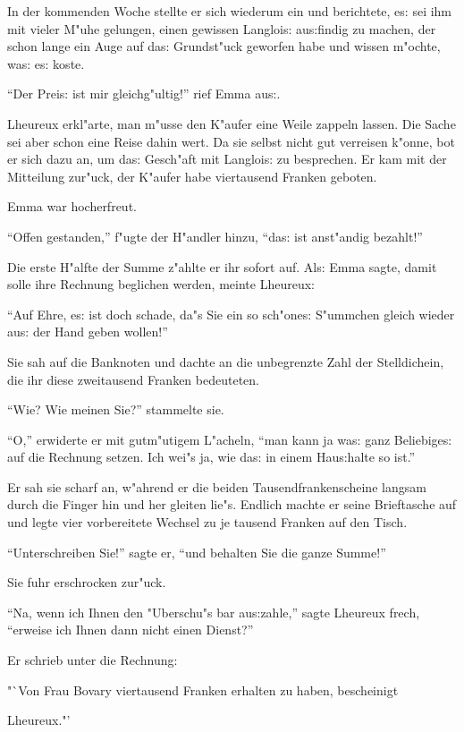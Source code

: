 \documentclass[oneside,12pt]{book}
\newcommand{\s}{s:}%
\begin{document}
In der kommenden Woche stellte er sich wiederum ein und berichtete,
e{\s} sei ihm mit vieler M"uhe gelungen, einen gewissen Langloi{\s}
au{\s}findig zu machen, der schon lange ein Auge auf da{\s}
Grundst"uck geworfen habe und wissen m"ochte, wa{\s} e{\s} koste.

"`Der Prei{\s} ist mir gleichg"ultig!"' rief Emma au{\s}.

Lheureux erkl"arte, man m"usse den K"aufer eine Weile zappeln
lassen. Die Sache sei aber schon eine Reise dahin wert. Da sie
selbst nicht gut verreisen k"onne, bot er sich dazu an, um da{\s}
Gesch"aft mit Langloi{\s} zu besprechen. Er kam mit der Mitteilung
zur"uck, der K"aufer habe viertausend Franken geboten.

Emma war hocherfreut.

"`Offen gestanden,"' f"ugte der H"andler hinzu, "`da{\s} ist
anst"andig bezahlt!"'

Die erste H"alfte der Summe z"ahlte er ihr sofort auf. Al{\s} Emma
sagte, damit solle ihre Rechnung beglichen werden, meinte
Lheureux:

"`Auf Ehre, e{\s} ist doch schade, da"s Sie ein so sch"one{\s}
S"ummchen gleich wieder au{\s} der Hand geben wollen!"'

Sie sah auf die Banknoten und dachte an die unbegrenzte Zahl der
Stelldichein, die ihr diese zweitausend Franken bedeuteten.

"`Wie? Wie meinen Sie?"' stammelte sie.

"`O,"' erwiderte er mit gutm"utigem L"acheln, "`man kann ja wa{\s}
ganz Beliebige{\s} auf die Rechnung setzen. Ich wei"s ja, wie
da{\s} in einem Hau{\s}halte so ist."'

Er sah sie scharf an, w"ahrend er die beiden Tausendfrankenscheine
langsam durch die Finger hin und her gleiten lie"s. Endlich machte
er seine Brieftasche auf und legte vier vorbereitete Wechsel zu je
tausend Franken auf den Tisch.

"`Unterschreiben Sie!"' sagte er, "`und behalten Sie die ganze
Summe!"'

Sie fuhr erschrocken zur"uck.

"`Na, wenn ich Ihnen den "Uberschu"s bar au{\s}zahle,"' sagte
Lheureux frech, "`erweise ich Ihnen dann nicht einen Dienst?"'

Er schrieb unter die Rechnung:

"`Von Frau Bovary viertausend Franken erhalten zu haben,
bescheinigt

\hfill Lheureux."'
\end{document}

